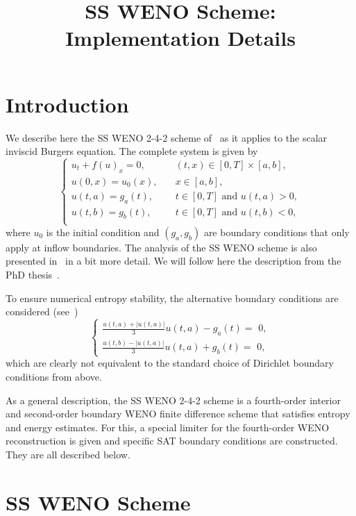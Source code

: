 \documentclass{scrartcl}
\title{SS WENO Scheme: Implementation Details}
\begin{document}
\maketitle

\section{Introduction} %

We describe here the SS WENO 2-4-2 scheme of~\cite{Fisher2013} as it applies to the
scalar inviscid Burgers equation. The complete system is given by
\[
\begin{cases}
    u_t + f(u)_x = 0, & \quad (t, x) \in [0, T] \times [a, b], \\
    u(0, x) = u_0(x), & \quad x \in [a, b], \\
    u(t, a) = g_a(t), & \quad t \in [0, T] \text{ and } u(t, a) > 0, \\
    u(t, b) = g_b(t), & \quad t \in [0, T] \text{ and } u(t, b) < 0, \\
\end{cases}
\]
where $u_0$ is the initial condition and $(g_a, g_b)$ are boundary conditions
that only apply at inflow boundaries. The analysis of the SS WENO scheme is
also presented in~\cite{Fisher2012} in a bit more detail. We will follow here
the description from the PhD thesis~\cite{Fisher2012}.

\begin{remark}
To ensure numerical entropy stability, the alternative boundary conditions are
considered (see~\cite[Section 4.1]{Fisher2013})
\[
\left\{
\begin{aligned}
\frac{u(t, a) + |u(t, a)|}{3} u(t, a) - g_a(t) =\,\, 0, \\
\frac{u(t, b) - |u(t, a)|}{3} u(t, a) + g_b(t) =\,\, 0,
\end{aligned}
\right.
\]
which are clearly not equivalent to the standard choice of Dirichlet boundary
conditions from above.
\end{remark}

As a general description, the SS WENO 2-4-2 scheme is a fourth-order interior
and second-order boundary WENO finite difference scheme that satisfies entropy
and energy estimates. For this, a special limiter for the fourth-order WENO
reconstruction is given and specific SAT boundary conditions are constructed.
They are all  described below.


\section{SS WENO Scheme} %
\label{sc:ssweno}
\end{document}
